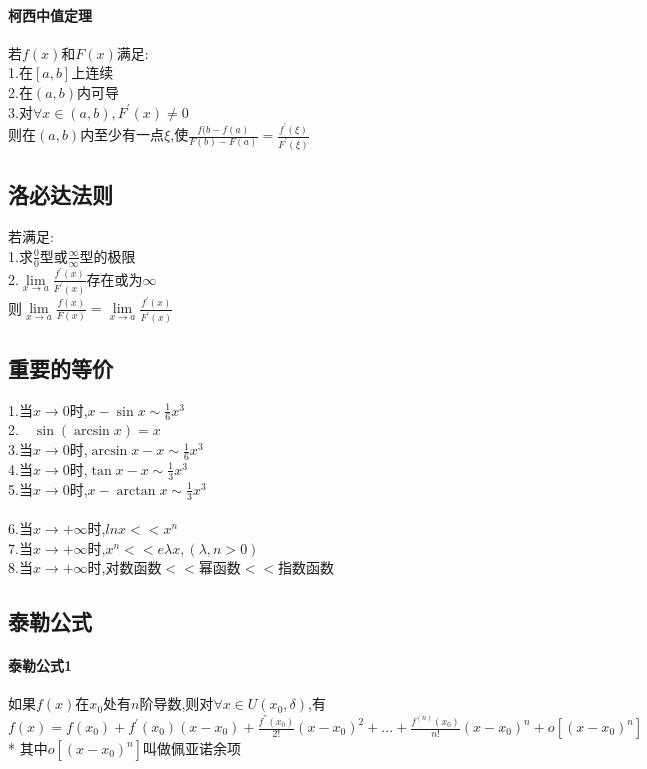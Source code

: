 \documentclass{article}
\begin{document}
\begin{flushleft}
	\paragraph{柯西中值定理}
	若$f(x)$和$F(x)$满足:\\
	1.在$[a,b]$上连续\\
	2.在$(a,b)$内可导\\
	3.对$\forall x\in (a,b),F^{'}(x)\neq 0$\\
	则在$(a,b)$内至少有一点$\xi$,使$\frac{f(b-f(a)}{F(b)-F(a)}=\frac{f^{'}(\xi)}{F^{'}(\xi)}$\\
	
	\subsection{洛必达法则}
	
	若满足:\\
	1.求$\frac{0}{0}$型或$\frac{\infty}{\infty}$型的极限\\
	2.$\lim\limits_{x\to a}\frac{f^{'}(x)}{F^{'}(x)}$存在或为$\infty$\\
	则$\lim\limits_{x\to a}\frac{f(x)}{F(x)}=\lim\limits_{x\to a}\frac{f^{'}(x)}{F^{'}(x)}$\\
	
	\subsection{重要的等价}
	
	1.当$x\to 0$时,$x-\sin x \sim \frac{1}{6}x^3$\\
	2.\ \ $\sin(\arcsin x)=x$\\
	3.当$x\to 0$时,$\arcsin x-x \sim \frac{1}{6}x^3$\\
	4.当$x\to 0$时,$\tan x-x \sim \frac{1}{3}x^3$\\
	5.当$x\to 0$时,$x-\arctan x \sim \frac{1}{3}x^3$\\
	~\\
	6.当$x\to +\infty$时,$lnx << x^n$\\
	7.当$x\to +\infty$时,$x^n << e{\lambda x},(\lambda,n>0)$\\
	8.当$x\to +\infty$时,对数函数$<<$幂函数$<<$指数函数\\
	
	\subsection{泰勒公式}
	
	\paragraph{泰勒公式1}
	如果$f(x)$在$x_0$处有$n$阶导数,则对$\forall x \in U(x_0,\delta)$,有$f(x)=f(x_0)+f^{'}(x_0)(x-x_0)+\frac{f^{''}(x_0)}{2!}(x-x_0)^2+...+\frac{f^{(n)}(x_0)}{n!}(x-x_0)^n+o[(x-x_0)^n]$\\
	* 其中$o[(x-x_0)^n]$叫做佩亚诺余项\\
	~\\

\end{flushleft}
\end{document}
